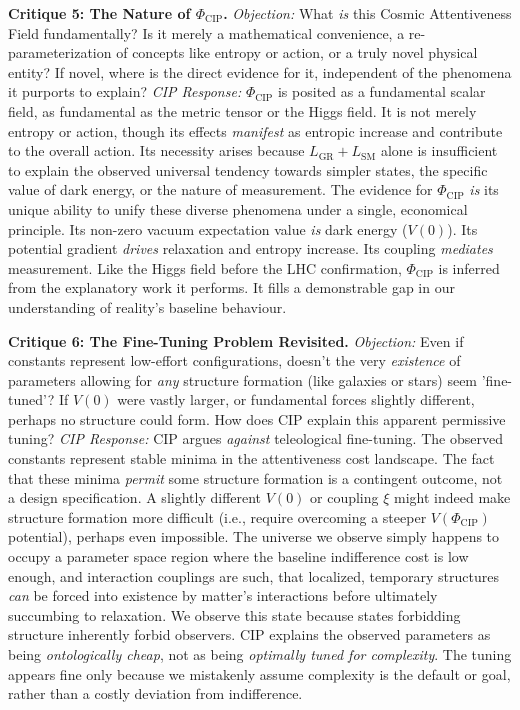 \documentclass[11pt, a4paper]{article}
\newcommand{\subt}[1]{\mathrm{#1}}
\begin{document}
\textbf{Critique 5: The Nature of $\Phi_{\subt{CIP}}$.}
\textit{Objection:} What \textit{is} this Cosmic Attentiveness Field fundamentally? Is it merely a mathematical convenience, a re-parameterization of concepts like entropy or action, or a truly novel physical entity? If novel, where is the direct evidence for it, independent of the phenomena it purports to explain?
\textit{CIP Response:} $\Phi_{\subt{CIP}}$ is posited as a fundamental scalar field, as fundamental as the metric tensor or the Higgs field. It is not merely entropy or action, though its effects \textit{manifest} as entropic increase and contribute to the overall action. Its necessity arises because $L_{\subt{GR}} + L_{\subt{SM}}$ alone is insufficient to explain the observed universal tendency towards simpler states, the specific value of dark energy, or the nature of measurement. The evidence for $\Phi_{\subt{CIP}}$ \textit{is} its unique ability to unify these diverse phenomena under a single, economical principle. Its non-zero vacuum expectation value \textit{is} dark energy ($V(0)$). Its potential gradient \textit{drives} relaxation and entropy increase. Its coupling \textit{mediates} measurement. Like the Higgs field before the LHC confirmation, $\Phi_{\subt{CIP}}$ is inferred from the explanatory work it performs. It fills a demonstrable gap in our understanding of reality's baseline behaviour.

\textbf{Critique 6: The Fine-Tuning Problem Revisited.}
\textit{Objection:} Even if constants represent low-effort configurations, doesn't the very \textit{existence} of parameters allowing for \textit{any} structure formation (like galaxies or stars) seem 'fine-tuned'? If $V(0)$ were vastly larger, or fundamental forces slightly different, perhaps no structure could form. How does CIP explain this apparent permissive tuning?
\textit{CIP Response:} CIP argues \textit{against} teleological fine-tuning. The observed constants represent stable minima in the attentiveness cost landscape. The fact that these minima \textit{permit} some structure formation is a contingent outcome, not a design specification. A slightly different $V(0)$ or coupling $\xi$ might indeed make structure formation more difficult (i.e., require overcoming a steeper $V(\Phi_{\subt{CIP}})$ potential), perhaps even impossible. The universe we observe simply happens to occupy a parameter space region where the baseline indifference cost is low enough, and interaction couplings are such, that localized, temporary structures \textit{can} be forced into existence by matter's interactions before ultimately succumbing to relaxation. We observe this state because states forbidding structure inherently forbid observers. CIP explains the observed parameters as being \textit{ontologically cheap}, not as being \textit{optimally tuned for complexity}. The tuning appears fine only because we mistakenly assume complexity is the default or goal, rather than a costly deviation from indifference.
\end{document}
